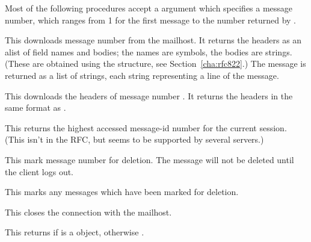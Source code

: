 Most of the following procedures accept a  argument which
specifies a message number, which ranges from 1 for the first message
to the number returned by .

\begin{desc}
  This downloads message number  from the mailhost.
  It returns the headers as an alist of field names and bodies; the
  names are symbols, the bodies are strings.  (These are obtained
  using the  structure, see Section~\ref{cha:rfc822}.)
  The message is returned as a list of strings, each string
  representing a line of the message.
\end{desc}

\begin{desc}
  This downloads the headers of message number .  It
  returns the headers in the same format as .
\end{desc}

\begin{desc}
  This returns the highest accessed message-id number for the current
  session.  (This isn't in the RFC, but seems to be supported by several
  servers.)
\end{desc}

\begin{desc}
  This mark message number  for deletion.  The message will
  not be deleted until the client logs out.
\end{desc}

\begin{desc}
  This marks any messages which have been marked for deletion.
\end{desc}

\begin{desc}
  This closes the connection with the mailhost.
\end{desc}

\begin{desc}
  This returns \sharpt{} if  is a  object,
  otherwise \sharpf.
\end{desc}

